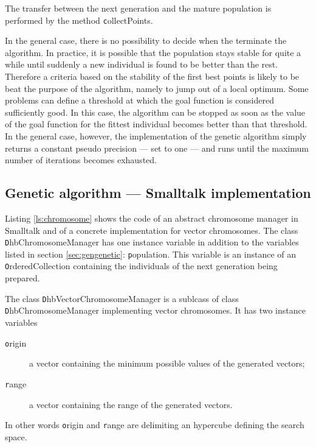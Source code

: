 \noindent The transfer between the next generation and the mature
population is performed by the method {\texttt collectPoints}.

In the general case, there is no possibility to decide when the
terminate the algorithm. In practice, it is possible that the
population stays stable for quite a while until suddenly a new
individual is found to be better than the rest. Therefore a
criteria based on the stability of the first best points is likely
to be beat the purpose of the algorithm, namely to jump out of a
local optimum. Some problems can define a threshold at which the
goal function is considered sufficiently good. In this case, the
algorithm can be stopped as soon as the value of the goal function
for the fittest individual becomes better than that threshold. In
the general case, however, the implementation of the genetic
algorithm simply returns a constant pseudo precision
--- set to one --- and runs until the maximum number of iterations
becomes exhausted.

\subsection{Genetic algorithm --- Smalltalk implementation}
 Listing \ref{ls:chromosome}
shows the code of an abstract chromosome manager in Smalltalk and
of a concrete implementation for vector chromosomes. The class
{\texttt DhbChromosomeManager} has one instance variable in addition
to the variables listed in section \ref{sec:gengenetic}: {\texttt
population}. This variable is an instance of an {\texttt
OrderedCollection} containing the individuals of the next
generation being prepared.

The class {\texttt DhbVectorChromosomeManager} is a sublcass of class
{\texttt DhbChromosomeManager} implementing vector chromosomes. It has
two instance variables
\begin{description}
  \item[\texttt origin] a vector containing the minimum possible
  values of the generated vectors;
  \item[\texttt range] a vector containing the range of the generated
  vectors.
\end{description}
In other words {\texttt origin} and {\texttt range} are delimiting an
hypercube defining the search space.

